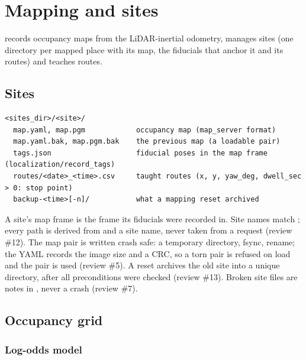 \chapter{Mapping and sites}
\label{ch:mapping}

 records occupancy maps from the LiDAR-inertial odometry, manages sites
(one directory per mapped place with its map, the fiducials that anchor it and its routes) and
teaches routes.

\section{Sites}

\begin{lstlisting}
<sites_dir>/<site>/
  map.yaml, map.pgm            occupancy map (map_server format)
  map.yaml.bak, map.pgm.bak    the previous map (a loadable pair)
  tags.json                    fiducial poses in the map frame (localization/record_tags)
  routes/<date>_<time>.csv     taught routes (x, y, yaw_deg, dwell_sec > 0: stop point)
  backup-<time>[-n]/           what a mapping reset archived
\end{lstlisting}

A site's map frame is the frame its fiducials were recorded in. Site names match
; every path is derived from  and a site name,
never taken from a request (review \#12). The map pair is written crash safe: a temporary
directory, fsync, rename; the YAML records the image size and a CRC, so a torn pair is refused
on load and the  pair is used (review \#5). A reset archives the old site into a
unique  directory, after all preconditions were checked (review \#13).
Broken site files are notes in , never a crash (review \#7).

\section{Occupancy grid}

\subsection{Log-odds model}

